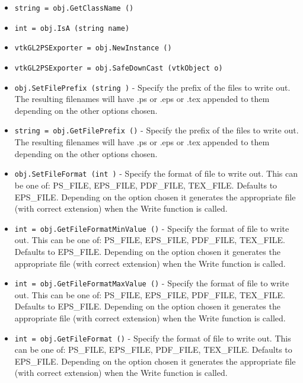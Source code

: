 \begin{itemize}
\item  \verb|string = obj.GetClassName ()|

\item  \verb|int = obj.IsA (string name)|

\item  \verb|vtkGL2PSExporter = obj.NewInstance ()|

\item  \verb|vtkGL2PSExporter = obj.SafeDownCast (vtkObject o)|

\item  \verb|obj.SetFilePrefix (string )| -  Specify the prefix of the files to write out. The resulting filenames
 will have .ps or .eps or .tex appended to them depending on the
 other options chosen.

\item  \verb|string = obj.GetFilePrefix ()| -  Specify the prefix of the files to write out. The resulting filenames
 will have .ps or .eps or .tex appended to them depending on the
 other options chosen.

\item  \verb|obj.SetFileFormat (int )| -  Specify the format of file to write out.  This can be one of:
 PS\_FILE, EPS\_FILE, PDF\_FILE, TEX\_FILE.  Defaults to EPS\_FILE.
 Depending on the option chosen it generates the appropriate file
 (with correct extension) when the Write function is called.

\item  \verb|int = obj.GetFileFormatMinValue ()| -  Specify the format of file to write out.  This can be one of:
 PS\_FILE, EPS\_FILE, PDF\_FILE, TEX\_FILE.  Defaults to EPS\_FILE.
 Depending on the option chosen it generates the appropriate file
 (with correct extension) when the Write function is called.

\item  \verb|int = obj.GetFileFormatMaxValue ()| -  Specify the format of file to write out.  This can be one of:
 PS\_FILE, EPS\_FILE, PDF\_FILE, TEX\_FILE.  Defaults to EPS\_FILE.
 Depending on the option chosen it generates the appropriate file
 (with correct extension) when the Write function is called.

\item  \verb|int = obj.GetFileFormat ()| -  Specify the format of file to write out.  This can be one of:
 PS\_FILE, EPS\_FILE, PDF\_FILE, TEX\_FILE.  Defaults to EPS\_FILE.
 Depending on the option chosen it generates the appropriate file
 (with correct extension) when the Write function is called.


\end{itemize}
